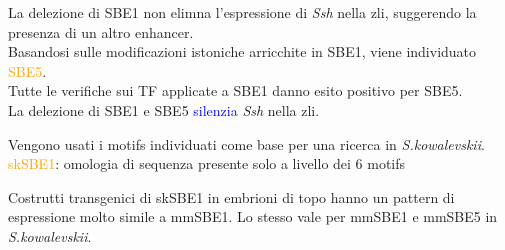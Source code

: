 \documentclass{beamer}
\newcommand{\warn}[1]{\textcolor{blue}{#1}}
\newcommand{\hh}[1]{\textcolor{orange}{#1}}
\begin{document}
    \begin{frame}
        La delezione di SBE1 non elimna l'espressione di \emph{Ssh} nella zli,
        suggerendo la presenza di un altro enhancer.\\
        Basandosi sulle modificazioni istoniche arricchite in SBE1, viene individuato \hh{SBE5}.\\
        Tutte le verifiche sui TF applicate a SBE1 danno esito positivo per SBE5.\\
        La delezione di SBE1 e SBE5 \warn{silenzia} \emph{Ssh} nella zli.
    \end{frame}

    \begin{frame}
        Vengono usati i motifs individuati come base per una ricerca in \emph{S.kowalevskii}.\\
        \hh{skSBE1}: omologia di sequenza presente solo a livello dei 6 motifs
    \end{frame}

    \begin{frame}
        Costrutti transgenici di skSBE1 in embrioni di topo hanno un pattern di espressione
        molto simile a mmSBE1. Lo stesso vale per mmSBE1 e mmSBE5 in \emph{S.kowalevskii}.
    \end{frame}
\end{document}
